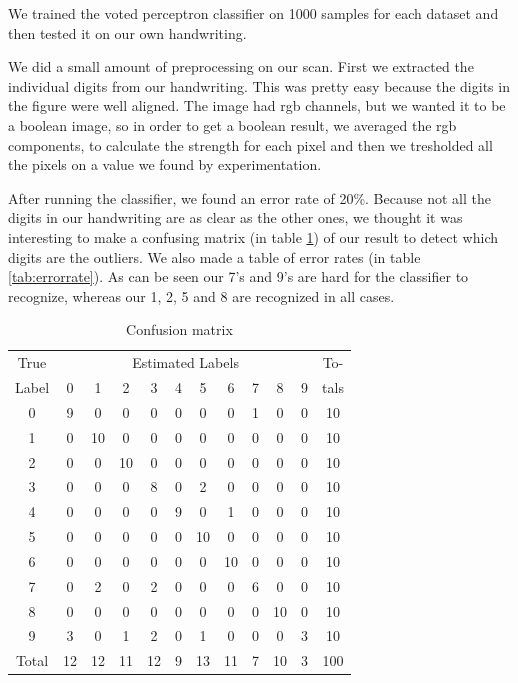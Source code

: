 \documentclass[%
        compressed,
        final,
        notitlepage,
        narroweqnarray,
        inline,
        twoside,
        ]{ieee}
\begin{document}
We trained the voted perceptron classifier on 1000 samples for each dataset and
then tested it on our own handwriting.

We did a small amount of preprocessing on our scan. First we extracted the
individual digits from our handwriting. This was pretty easy because the digits
in the figure were well aligned. The image had rgb channels, but we wanted it to
be a boolean image, so in order to get a boolean result, we averaged the rgb
components, to calculate the strength for each pixel and then we tresholded all the
pixels on a value we found by experimentation.

After running the classifier, we found an error rate of 20\%.
Because not all the digits in our handwriting are as clear as the other ones, we
thought it was interesting to make a confusing matrix (in table
\ref{tab:confmatrix}) of our result to detect which digits are the outliers.
We also made a table of error rates (in table \ref{tab:errorrate}).
As can be seen our 7's and 9's are hard for the classifier to recognize, whereas
our 1, 2, 5 and 8 are recognized in all cases.

\begin{table}[H]
    \centering
    \begin{tabular}{|c|cccccccccc | c|}
        \hline 
        True   & \multicolumn{10}{c|}{Estimated Labels} & To-\\
        Label & 0 & 1 & 2 & 3 & 4 & 5 & 6 & 7 & 8 & 9 & tals \\
        \hline
        0 & 9 & 0  & 0  & 0 & 0 & 0  & 0  & 1 & 0  & 0 & 10 \\
        1 & 0 & 10 & 0  & 0 & 0 & 0  & 0  & 0 & 0  & 0 & 10 \\
        2 & 0 & 0  & 10 & 0 & 0 & 0  & 0  & 0 & 0  & 0 & 10 \\
        3 & 0 & 0  & 0  & 8 & 0 & 2  & 0  & 0 & 0  & 0 & 10 \\
        4 & 0 & 0  & 0  & 0 & 9 & 0  & 1  & 0 & 0  & 0 & 10 \\
        5 & 0 & 0  & 0  & 0 & 0 & 10 & 0  & 0 & 0  & 0 & 10 \\
        6 & 0 & 0  & 0  & 0 & 0 & 0  & 10 & 0 & 0  & 0 & 10 \\
        7 & 0 & 2  & 0  & 2 & 0 & 0  & 0  & 6 & 0  & 0 & 10 \\
        8 & 0 & 0  & 0  & 0 & 0 & 0  & 0  & 0 & 10 & 0 & 10 \\
        9 & 3 & 0  & 1  & 2 & 0 & 1  & 0  & 0 & 0  & 3 & 10 \\
        \hline 
        Total & 12 & 12 & 11 & 12 & 9 & 13 & 11 & 7 & 10 & 3 & 100 \\
        \hline 
    \end{tabular}
    \caption{Confusion matrix}
    \label{tab:confmatrix}
\end{table}
\end{document}
